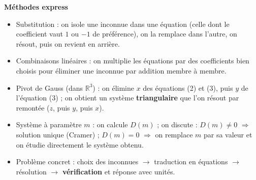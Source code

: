 \documentclass[11pt]{article}
\newcommand{\cle}[1]{{\popxbold\color{popdark}#1}}
\begin{document}
\begin{bilan}
\textbf{Méthodes express}
\begin{itemize}
\item \cle{Substitution} : on isole une inconnue dans une équation (celle dont le coefficient vaut $1$ ou $-1$ de préférence), on la remplace dans l'autre, on résout, puis on revient en arrière.
\item \cle{Combinaisons linéaires} : on multiplie les équations par des coefficients bien choisis pour éliminer une inconnue par addition membre à membre.
\item \cle{Pivot de Gauss} (dans $\mathbb{R}^3$) : on élimine $x$ des équations (2) et (3), puis $y$ de l'équation (3) ; on obtient un système \textbf{triangulaire} que l'on résout par remontée ($z$, puis $y$, puis $x$).
\item \cle{Système à paramètre} $m$ : on calcule $D(m)$ ; on discute : $D(m)\neq 0$ $\Rightarrow$ solution unique (Cramer) ; $D(m)=0$ $\Rightarrow$ on remplace $m$ par sa valeur et on étudie directement le système obtenu.
\item \cle{Problème concret} : choix des inconnues $\to$ traduction en équations $\to$ résolution $\to$ \textbf{vérification} et réponse avec unités.
\end{itemize}
\end{bilan}
\end{document}
